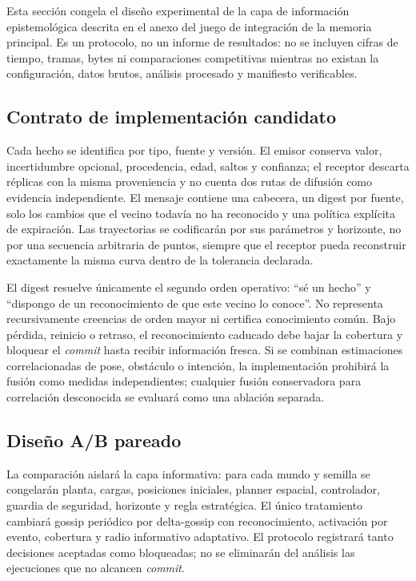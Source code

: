 \label{supp:epistemic-delta-gossip}

Esta sección congela el diseño experimental de la capa de información
epistemológica descrita en el anexo del juego de integración de la memoria
principal. Es un protocolo, no un informe de resultados: no se incluyen cifras de tiempo,
tramas, bytes ni comparaciones competitivas mientras no existan la
configuración, datos brutos, análisis procesado y manifiesto verificables.

\subsection{Contrato de implementación candidato}

Cada hecho se identifica por tipo, fuente y versión. El emisor conserva valor,
incertidumbre opcional, procedencia, edad, saltos y confianza; el receptor
descarta réplicas con la misma proveniencia y no cuenta dos rutas de difusión
como evidencia independiente. El mensaje contiene una cabecera, un digest por
fuente, solo los cambios que el vecino todavía no ha reconocido y una política
explícita de expiración. Las trayectorias se codificarán por sus parámetros y
horizonte, no por una secuencia arbitraria de puntos, siempre que el receptor
pueda reconstruir exactamente la misma curva dentro de la tolerancia declarada.

El digest resuelve únicamente el segundo orden operativo: ``sé un hecho'' y
``dispongo de un reconocimiento de que este vecino lo conoce''. No representa
recursivamente creencias de orden mayor ni certifica conocimiento común. Bajo
pérdida, reinicio o retraso, el reconocimiento caducado debe bajar la cobertura
y bloquear el \emph{commit} hasta recibir información fresca. Si se combinan
estimaciones correlacionadas de pose, obstáculo o intención, la implementación
prohibirá la fusión como medidas independientes; cualquier fusión conservadora
para correlación desconocida se evaluará como una ablación separada.

\subsection{Diseño A/B pareado}

La comparación aislará la capa informativa: para cada mundo y semilla se
congelarán planta, cargas, posiciones iniciales, planner espacial,
controlador, guardia de seguridad, horizonte y regla estratégica. El único
tratamiento cambiará gossip periódico por delta-gossip con reconocimiento,
activación por evento, cobertura y radio informativo adaptativo. El protocolo
registrará tanto decisiones aceptadas como bloqueadas; no se eliminarán del
análisis las ejecuciones que no alcancen \emph{commit}.

